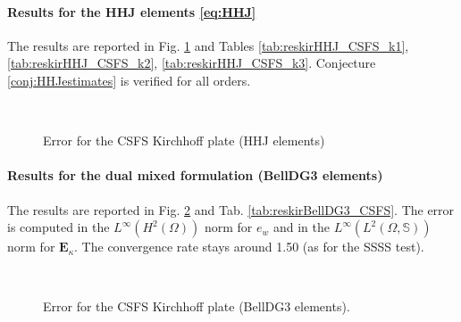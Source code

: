 \paragraph{Results for the HHJ elements \eqref{eq:HHJ}}
The results are reported in Fig. \ref{fig:errorHHJ_CSSF} and Tables \ref{tab:reskirHHJ_CSFS_k1}, \ref{tab:reskirHHJ_CSFS_k2}, \ref{tab:reskirHHJ_CSFS_k3}. Conjecture \ref{conj:HHJestimates} is verified for all orders.

\begin{figure}[htbp]%
	\centering
	\hspace{8pt}%
	 \\
	\caption{Error for the CSFS Kirchhoff plate (HHJ elements)}%
	\label{fig:errorHHJ_CSSF}%
\end{figure}

\paragraph{Results for the dual mixed formulation (BellDG3 elements)}
The results are reported in Fig. \ref{fig:errorBellDG3_CSFS} and Tab. \ref{tab:reskirBellDG3_CSFS}. The error is computed in the $L^\infty (H^2(\Omega))$ norm for $e_w$ and in the $L^\infty (L^2(\Omega, \mathbb{S}))$ norm for $\bm{E}_\kappa$. The convergence rate stays around 1.50 (as for the SSSS test).


\begin{figure}[htbp]%
	\centering
	\hspace{8pt}%
	 \\
	\caption{Error for the CSFS Kirchhoff plate (BellDG3 elements).}%
	\label{fig:errorBellDG3_CSFS}%
\end{figure}



